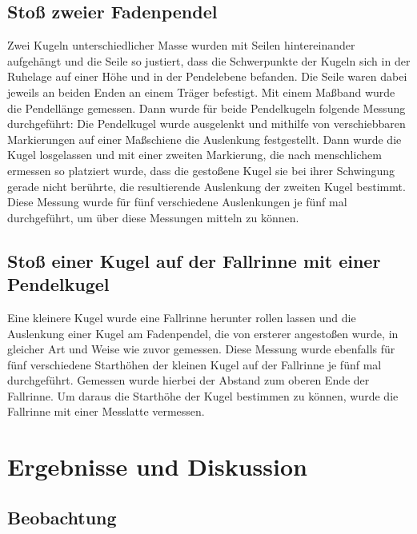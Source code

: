 \documentclass[
	a4paper,
	12pt,
	pagesize,
	ngerman
]{scrartcl}
\begin{document}
	\subsection{Stoß zweier Fadenpendel} %
	Zwei Kugeln unterschiedlicher Masse wurden mit Seilen hintereinander aufgehängt und die Seile so justiert, dass die Schwerpunkte der Kugeln sich in der Ruhelage auf einer Höhe und in der Pendelebene befanden.
	Die Seile waren dabei jeweils an beiden Enden an einem Träger befestigt.
	Mit einem Maßband wurde die Pendellänge gemessen.
	Dann wurde für beide Pendelkugeln folgende Messung durchgeführt:
	Die Pendelkugel wurde ausgelenkt und mithilfe von verschiebbaren Markierungen auf einer Maßschiene die Auslenkung festgestellt.
	Dann wurde die Kugel losgelassen und mit einer zweiten Markierung, die nach menschlichem ermessen so platziert wurde, dass die gestoßene Kugel sie bei ihrer Schwingung gerade nicht berührte, die resultierende Auslenkung der zweiten Kugel bestimmt.
	Diese Messung wurde für fünf verschiedene Auslenkungen je fünf mal durchgeführt, um über diese Messungen mitteln zu können. %
	\subsection{Stoß einer Kugel auf der Fallrinne mit einer Pendelkugel} %
	Eine kleinere Kugel wurde eine Fallrinne herunter rollen lassen und die Auslenkung einer Kugel am Fadenpendel, die von ersterer angestoßen wurde, in gleicher Art und Weise wie zuvor gemessen.
	Diese Messung wurde ebenfalls für fünf  verschiedene Starthöhen der kleinen Kugel auf der Fallrinne je fünf mal durchgeführt.
	Gemessen wurde hierbei der Abstand zum oberen Ende der Fallrinne.
	Um daraus die Starthöhe der Kugel bestimmen zu können, wurde die Fallrinne mit einer Messlatte vermessen. %
	
	
	\section{Ergebnisse und Diskussion}
	

	\subsection{Beobachtung}
\end{document}
